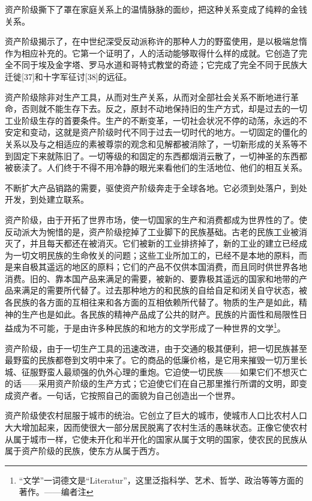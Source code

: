 \documentclass[UTF8,zihao=-4,a4paper]{ctexart}
\begin{document}
资产阶级撕下了罩在家庭关系上的温情脉脉的面纱，把这种关系变成了纯粹的金钱关系。\par
资产阶级揭示了，在中世纪深受反动派称许的那种人力的野蛮使用，是以极端怠惰作为相应补充的。它第一个证明了，人的活动能够取得什么样的成就。它创造了完全不同于埃及金字塔、罗马水道和哥特式教堂的奇迹；它完成了完全不同于民族大迁徙[37]和十字军征讨[38]的远征。\par
资产阶级除非对生产工具，从而对生产关系，从而对全部社会关系不断地进行革命，否则就不能生存下去。反之，原封不动地保持旧的生产方式，却是过去的一切工业阶级生存的首要条件。生产的不断变革，一切社会状况不停的动荡，永远的不安定和变动，这就是资产阶级时代不同于过去一切时代的地方。一切固定的僵化的关系以及与之相适应的素被尊崇的观念和见解都被消除了，一切新形成的关系等不到固定下来就陈旧了。一切等级的和固定的东西都烟消云散了，一切神圣的东西都被亵渎了。人们终于不得不用冷静的眼光来看他们的生活地位、他们的相互关系。\par
不断扩大产品销路的需要，驱使资产阶级奔走于全球各地。它必须到处落户，到处开发，到处建立联系。\par
资产阶级，由于开拓了世界市场，使一切国家的生产和消费都成为世界性的了。使反动派大为惋惜的是，资产阶级挖掉了工业脚下的民族基础。古老的民族工业被消灭了，并且每天都还在被消灭。它们被新的工业排挤掉了，新的工业的建立已经成为一切文明民族的生命攸关的问题；这些工业所加工的，已经不是本地的原料，而是来自极其遥远的地区的原料；它们的产品不仅供本国消费，而且同时供世界各地消费。旧的、靠本国产品来满足的需要，被新的、要靠极其遥远的国家和地带的产品来满足的需要所代替了。过去那种地方的和民族的自给自足和闭关自守状态，被各民族的各方面的互相往来和各方面的互相依赖所代替了。物质的生产是如此，精神的生产也是如此。各民族的精神产品成了公共的财产。民族的片面性和局限性日益成为不可能，于是由许多种民族的和地方的文学形成了一种世界的文学\footnote{“文学”一词德文是“Literatur”，这里泛指科学、艺术、哲学、政治等等方面的著作。——编者注}。\par
资产阶级，由于一切生产工具的迅速改进，由于交通的极其便利，把一切民族甚至最野蛮的民族都卷到文明中来了。它的商品的低廉价格，是它用来摧毁一切万里长城、征服野蛮人最顽强的仇外心理的重炮。它迫使一切民族——如果它们不想灭亡的话——采用资产阶级的生产方式；它迫使它们在自己那里推行所谓的文明，即变成资产者。一句话，它按照自己的面貌为自己创造出一个世界。\par
资产阶级使农村屈服于城市的统治。它创立了巨大的城市，使城市人口比农村人口大大增加起来，因而使很大一部分居民脱离了农村生活的愚昧状态。正像它使农村从属于城市一样，它使未开化和半开化的国家从属于文明的国家，使农民的民族从属于资产阶级的民族，使东方从属于西方。\par
\end{document}
